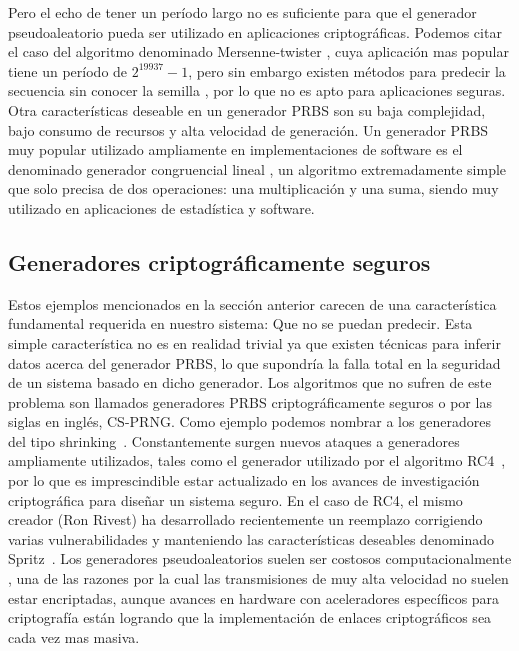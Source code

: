 Pero el echo de tener un período largo no es suficiente para que el generador pseudoaleatorio pueda ser utilizado en aplicaciones criptográficas. Podemos citar el caso del algoritmo denominado Mersenne-twister \cite{matsumoto1998mersenne}, cuya aplicación mas popular tiene un período de $2^{19937}-1$, pero sin embargo existen métodos para predecir la secuencia sin conocer la semilla \cite{argyros2012forgot}, por lo que no es apto para aplicaciones seguras.
Otra características deseable en un generador PRBS son su baja complejidad, bajo consumo de recursos y alta velocidad de generación. Un generador PRBS muy popular utilizado ampliamente en implementaciones de software es el denominado generador congruencial lineal \cite{park1988random}, un algoritmo extremadamente simple que solo precisa de dos operaciones: una multiplicación y una suma, siendo muy utilizado en aplicaciones de estadística y software.

\subsection{Generadores criptográficamente seguros}

Estos ejemplos mencionados en la sección anterior carecen de una característica fundamental requerida en nuestro sistema: Que no se puedan predecir. Esta simple característica no es en realidad trivial ya que existen técnicas \cite{argyros2012forgot} para inferir datos acerca del generador PRBS, lo que supondría la falla total en la seguridad de un sistema basado en dicho generador. Los algoritmos que no sufren de este problema son llamados generadores PRBS criptográficamente seguros o por las siglas en inglés, CS-PRNG. Como ejemplo podemos nombrar a los generadores del tipo shrinking~\cite{coppersmith1994shrinking}.
Constantemente surgen nuevos ataques a generadores ampliamente utilizados, tales como el generador utilizado por el algoritmo RC4~\cite{vaudenay2007passive}, por lo que es imprescindible estar actualizado en los avances de investigación criptográfica para diseñar un sistema seguro. En el caso de RC4, el mismo creador (Ron Rivest) ha desarrollado recientemente un reemplazo corrigiendo varias vulnerabilidades y manteniendo las características deseables denominado Spritz~\cite{RS14}. Los generadores pseudoaleatorios suelen ser costosos computacionalmente , una de las razones por la cual las transmisiones de muy alta velocidad no suelen estar encriptadas, aunque avances en hardware con aceleradores específicos para criptografía \cite{firasta2008intel} están logrando que la implementación de enlaces criptográficos sea cada vez mas masiva.


